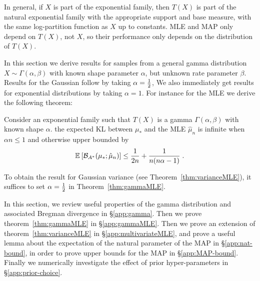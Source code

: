 \documentclass[twoside]{article}
\newcommand*{\expect}[2][]{\ensuremath{\mathbb{E}_{#1} \left[ #2 \right] }} %
\newcommand{\logpart}{A}
\newcommand{\bregmanconj}{\cB_{\logpart^*}}
\begin{document}
In general, if $X$ is part of the exponential family, then $T(X)$ is part of the natural exponential family with the appropriate support and base measure, with the same log-partition function as $X$ up to constants.
MLE and MAP only depend on $T(X)$, not $X$, so their performance only depends on the distribution of $T(X)$.
 
In this section we derive results for samples  from a general gamma distribution $X \sim \Gamma(\alpha,\beta)$ with known shape parameter $\alpha$, but unknown rate parameter $\beta$.
Results for the Gaussian follow by taking $\alpha=\frac{1}{2}$,
We also immediately get results for exponential distributions by taking $\alpha=1$.
For instance for the MLE we derive the following theorem:

\begin{theorem}
	\label{thm:gammaMLE}
	Consider an exponential family such that $T(X)$ is a gamma $\Gamma(\alpha, \beta)$ with known shape $\alpha$.
	the expected KL between $\mu_*$ and the MLE $\hat\mu_n$	is infinite when $\alpha n\leq 1$ and otherwise upper bounded by
	\begin{align}
		 \expect{\bregmanconj( \mu_*; \hat \mu_n) }
			\leq \inv{2n} + \frac{1}{n(n \alpha-1)}  \; .
	\end{align}
\end{theorem}
	
To obtain the result for Gaussian variance (see Theorem~\ref{thm:varianceMLE}), it suffices to set $\alpha=\frac{1}{2}$ in Theorem~\ref{thm:gammaMLE}.

In this section, we review useful properties of the gamma distribution and associated Bregman divergence in \S\ref{app:gamma}. 
Then we prove theorem~\ref{thm:gammaMLE} in \S\ref{app:gammaMLE}.
Then we prove an extension of theorem~\ref{thm:varianceMLE} in \S\ref{app:multivariateMLE}, and prove a useful lemma about the expectation of the natural parameter of the MAP in \S\ref{app:nat-bound}, in order to prove upper bounds for the MAP in \S\ref{app:MAP-bound}.
Finally we numerically investigate the effect of prior hyper-parameters in \S\ref{app:prior-choice}.
\end{document}
